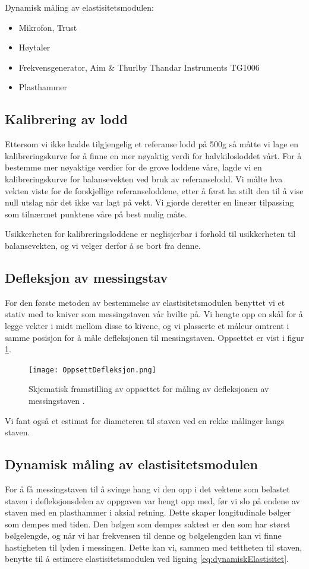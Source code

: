 \documentclass[a4paper,11pt, twocolumn]{article}
\begin{document}
Dynamisk måling av elastisitetsmodulen:
\begin{itemize}
	\item Mikrofon, Trust
	\item Høytaler 
	\item Frekvensgenerator, Aim \& Thurlby Thandar Instruments TG1006
	\item Plasthammer
\end{itemize}

\subsection{Kalibrering av lodd}
Ettersom vi ikke hadde tilgjengelig et referanse lodd på 500g så måtte vi lage en kalibreringskurve for å finne en mer nøyaktig verdi for halvkilosloddet vårt. For å bestemme mer nøyaktige verdier for de grove loddene våre, lagde vi en kalibreringskurve for balansevekten ved bruk av referanselodd. Vi målte hva vekten viste for de forskjellige referanseloddene, etter å først ha stilt den til å vise null utslag når det ikke var lagt på vekt. Vi gjorde deretter en lineær tilpassing som tilnærmet punktene våre på best mulig måte.

Usikkerheten for kalibreringsloddene er neglisjerbar i forhold til usikkerheten til balansevekten, og vi velger derfor å se bort fra denne.

\subsection{Defleksjon av messingstav}
For den første metoden av bestemmelse av elastisitetsmodulen benyttet vi et stativ med to kniver som messingstaven vår hvilte på. Vi hengte opp en skål for å legge vekter i midt mellom disse to kivene, og vi plasserte et måleur omtrent i samme posisjon for å måle defleksjonen til messingstaven. Oppsettet er vist i figur \ref{fig:oppsett}.

\begin{figure}[!ht]
\texttt{[image: OppsettDefleksjon.png]}
\caption{Skjematisk framstilling av oppsettet for måling av defleksjonen av messingstaven \cite{oppgavetekst}.}
\label{fig:oppsett}
\end{figure}

Vi fant også et estimat for diameteren til staven ved en rekke målinger langs staven.

\subsection{Dynamisk måling av elastisitetsmodulen}
For å få messingstaven til å svinge hang vi den opp i det vektene som belastet staven i defleksjonsdelen av oppgaven var hengt opp med, før vi slo på endene av staven med en plasthammer i aksial retning. Dette skaper longitudinale bølger som dempes med tiden. Den bølgen som dempes saktest er den som har størst bølgelengde, og når vi har frekvensen til denne og bølgelengden kan vi finne hastigheten til lyden i messingen. Dette kan vi, sammen med tettheten til staven, benytte til å estimere elastisitetsmodulen ved ligning \eqref{eq:dynamiskElastisitet}.
\end{document}
